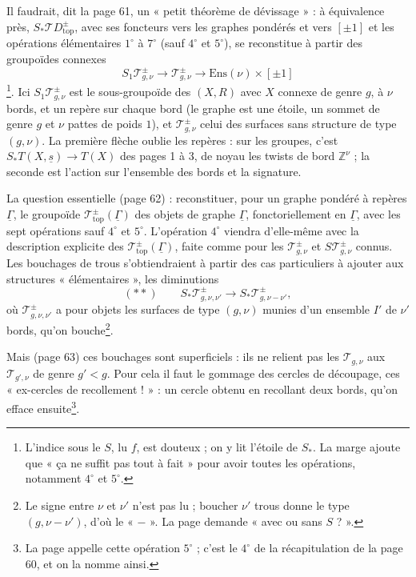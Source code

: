 \documentclass[11pt,a4paper]{article}
\begin{document}
Il faudrait, dit la page 61, un « petit théorème de dévissage » : à équivalence
près, $S_{*}\mathcal{T}D^{\pm}_{\mathrm{top}}$, avec ses foncteurs vers les
graphes pondérés et vers $[\pm 1]$ et les opérations élémentaires $1^\circ$ à
$7^\circ$ (sauf $4^\circ$ et $5^\circ$), se reconstitue à partir des
groupoïdes connexes
\[
S_{1}\mathcal{T}^{\pm}_{g,\nu} \longrightarrow \mathcal{T}^{\pm}_{g,\nu}
\longrightarrow \mathrm{Ens}(\nu) \times [\pm 1]
\]
\footnote{L'indice sous le $S$, lu $f$, est douteux ; on y lit l'étoile de
$S_{*}$. La marge ajoute que « ça ne suffit pas tout à fait » pour avoir toutes
les opérations, notamment $4^\circ$ et $5^\circ$.}. Ici
$S_{1}\mathcal{T}^{\pm}_{g,\nu}$ est le sous-groupoïde des $(X, R)$ avec $X$
connexe de genre $g$, à $\nu$ bords, et un repère sur chaque bord (le graphe
est une étoile, un sommet de genre $g$ et $\nu$ pattes de poids $1$), et
$\mathcal{T}^{\pm}_{g,\nu}$ celui des surfaces sans structure de type $(g, \nu)$.
La première flèche oublie les repères : sur les groupes, c'est $S_{*}T(X,
\underline{s}) \to T(X)$ des pages 1 à 3, de noyau les twists de bord
$\mathbb{Z}^{\nu}$ ; la seconde est l'action sur l'ensemble des bords et la
signature.

La question essentielle (page 62) : reconstituer, pour un graphe pondéré à
repères $\underline{\Gamma}$, le groupoïde
$\mathcal{T}^{\pm}_{\mathrm{top}}(\underline{\Gamma})$ des objets de graphe
$\underline{\Gamma}$, fonctoriellement en $\underline{\Gamma}$, avec les sept
opérations sauf $4^\circ$ et $5^\circ$. L'opération $4^\circ$ viendra d'elle-même
avec la description explicite des $\mathcal{T}^{\pm}_{\mathrm{top}}(\underline{\Gamma})$,
faite comme pour les $\mathcal{T}^{\pm}_{g,\nu}$ et $S\mathcal{T}^{\pm}_{g,\nu}$
connus. Les bouchages de trous s'obtiendraient à partir des cas particuliers à
ajouter aux structures « élémentaires », les diminutions
\[
(**)\qquad S_{*}\mathcal{T}^{\pm}_{g,\nu,\nu'} \longrightarrow
S_{*}\mathcal{T}^{\pm}_{g,\nu-\nu'},
\]
où $\mathcal{T}^{\pm}_{g,\nu,\nu'}$ a pour objets les surfaces de type $(g,\nu)$
munies d'un ensemble $I'$ de $\nu'$ bords, qu'on bouche\footnote{Le signe entre
$\nu$ et $\nu'$ n'est pas lu ; boucher $\nu'$ trous donne le type $(g, \nu -
\nu')$, d'où le « $-$ ». La page demande « avec ou sans $S$ ? ».}.

Mais (page 63) ces bouchages sont superficiels : ils ne relient pas les
$\mathcal{T}_{g,\nu}$ aux $\mathcal{T}_{g',\nu}$ de genre $g' < g$. Pour cela il
faut le gommage des cercles de découpage, ces « ex-cercles de recollement ! » : un
cercle obtenu en recollant deux bords, qu'on efface ensuite\footnote{La page
appelle cette opération $5^\circ$ ; c'est le $4^\circ$ de la récapitulation de
la page 60, et on la nomme ainsi.}.
\end{document}
